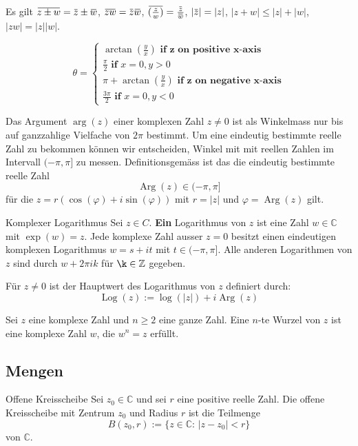 \documentclass[a4paper,10pt]{article}
\DeclareMathOperator{\Arg}{Arg}
\DeclareMathOperator{\Log}{Log}
\def\C{\mathbb{C}}
\newcommand{\overbar}[1]{\mkern 1.5mu\overline{\mkern-1.5mu#1\mkern-1.5mu}\mkern 1.5mu}
\begin{document}
Es gilt $\overbar{z \pm w} = \overbar{z} \pm \overbar{w}$, $\overbar{zw} = \overbar{z}\overbar{w}$, $\overbar{(\frac{z}{w})} = \frac{\overbar{z}}{\overbar{w}}$, $|\overbar{z}| = |z|$, $|z + w| \leq |z| + |w|$, $|zw| = |z| |w|$.

$$
\theta = \begin{cases}
  \arctan(\frac{y}{x}) \textbf{ if z on positive x-axis}\\
  \frac{\pi}{2} \textbf{ if }x=0, y > 0\\
  \pi + \arctan(\frac{y}{x}) \textbf{ if z on negative x-axis}\\
  \frac{3\pi}{2} \textbf{ if }x=0, y < 0
\end{cases}
$$

Das Argument $\arg(z)$ einer komplexen Zahl $z \neq 0$ ist als Winkelmass nur bis auf ganzzahlige Vielfache von $2\pi$ bestimmt. Um eine eindeutig bestimmte reelle Zahl zu bekommen können wir entscheiden, Winkel mit mit reellen Zahlen im Intervall $(-\pi,\pi]$ zu messen. Definitionsgemäss ist das die eindeutig bestimmte reelle Zahl
$$
\Arg(z) \in (-\pi, \pi]
$$
für die $z = r(\cos(\varphi) + i \sin(\varphi))$ mit $r = |z|$ und $\varphi = \Arg(z)$ gilt.

\begin{mainbox}{Komplexer Logarithmus}
  Sei $z \in C$. \textbf{Ein} Logarithmus von $z$ ist eine Zahl $w \in \C$ mit $\exp(w) = z$. Jede komplexe Zahl ausser $z = 0$ besitzt einen eindeutigen komplexen Logarithmus $w = s + it$ mit $t \in (-\pi, \pi]$. Alle anderen Logarithmen von $z$ sind durch $w + 2\pi ik$ für $\k \in \mathbb{Z}$ gegeben.

  Für $z \neq 0$ ist der Hauptwert des Logarithmus von $z$ definiert durch:
  $$
    \Log(z) := \log(|z|) + i \Arg(z)
  $$
\end{mainbox}

Sei \(z\) eine komplexe Zahl und \(n\geq2\) eine ganze Zahl. Eine \(n\)-te Wurzel von \(z\) ist eine komplexe Zahl \(w\), die \(w^n=z\) erfüllt.

\subsection{Mengen}

\begin{subbox}{Offene Kreisscheibe}
  Sei $z_0\in\mathbb{C}$ und sei $r$ eine positive reelle Zahl. Die offene Kreisscheibe mit Zentrum $z_0$ und Radius $r$ ist die Teilmenge
  $$
  B(z_0, r) := \{ z \in \mathbb{C} : \, |z-z_0| < r \}
  $$
  von $\mathbb{C}$.
\end{subbox}
\end{document}
